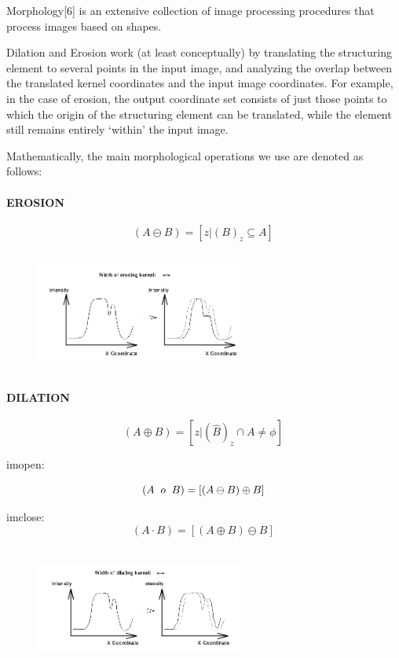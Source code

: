 \documentclass[conference]{IEEEtran}
\begin{document}
Morphology[6] is an extensive collection of image processing procedures that process images based on shapes.

 Dilation and Erosion work (at least conceptually) by translating the structuring element to several points in the input image, and analyzing the overlap between the translated kernel coordinates and the input image coordinates. For example, in the case of erosion, the output coordinate set consists of just those points to which the origin of the structuring element can be translated, while the element still remains entirely `within' the input image.

Mathematically, the main morphological operations we use are denoted as follows:

\paragraph{EROSION}
\[
    \left(A \ominus B\right) = \left[z|(B)_z\subseteq A \right]\,
\]
\begin{figure}[h!]
	\centering
	\includegraphics[width = 7cm, height = 4cm]{erosion}
\end{figure}

\paragraph{DILATION}
\[
    \left(A \oplus B\right) =  \left[z|(\widehat{B})_z\cap A \neq \phi \right]\,
\]

imopen:

\[
    \left(A \hspace{2mm} o\hspace{2mm} B\right) =  \left[\left(A \ominus B \right) \oplus B \right]\,
\]

imclose:
\[
    \left(A  \cdot  B\right) =  \left[\left(A \oplus B \right) \ominus B \right]\,
\]

\begin{figure}[h!]
	\centering
	\includegraphics[width = 7cm, height = 4cm]{dilation}
\end{figure}
\end{document}
